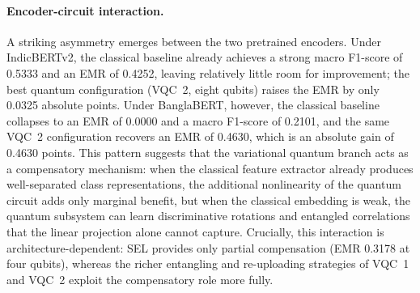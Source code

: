 \documentclass[runningheads]{llncs}
\begin{document}
\paragraph{Encoder-circuit interaction.}
A striking asymmetry emerges between the two pretrained encoders. Under IndicBERTv2, the classical baseline already achieves a strong macro F1-score of 0.5333 and an EMR of 0.4252, leaving relatively little room for improvement; the best quantum configuration (VQC~2, eight qubits) raises the EMR by only 0.0325 absolute points. Under BanglaBERT, however, the classical baseline collapses to an EMR of 0.0000 and a macro F1-score of 0.2101, and the same VQC~2 configuration recovers an EMR of 0.4630, which is an absolute gain of 0.4630 points. This pattern suggests that the variational quantum branch acts as a compensatory mechanism: when the classical feature extractor already produces well-separated class representations, the additional nonlinearity of the quantum circuit adds only marginal benefit, but when the classical embedding is weak, the quantum subsystem can learn discriminative rotations and entangled correlations that the linear projection alone cannot capture. Crucially, this interaction is architecture-dependent: SEL provides only partial compensation (EMR 0.3178 at four qubits), whereas the richer entangling and re-uploading strategies of VQC~1 and VQC~2 exploit the compensatory role more fully.

\end{document}
